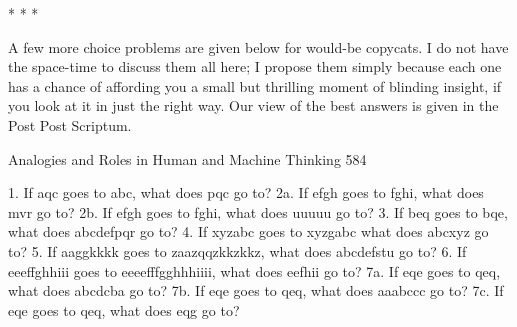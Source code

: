                                             *   *   *

        A few more choice problems are given below for would-be copycats. I do not
have the space-time to discuss them all here; I propose them simply because each one
has a chance of affording you a small but thrilling moment of blinding insight, if you
look at it in just the right way. Our view of the best answers is given in the Post Post
Scriptum.




Analogies and Roles in Human and Machine Thinking                                     584

       1. If aqc goes to abc, what does pqc go to?
       2a. If efgh goes to fghi, what does mvr go to?
       2b. If efgh goes to fghi, what does uuuuu go to?
       3. If beq goes to bqe, what does abcdefpqr go to?
       4. If xyzabc goes to xyzgabc what does abcxyz go to?
       5. If aaggkkkk goes to zaazqqzkkzkkz, what does abcdefstu go to?
       6. If eeeffghhiii goes to eeeefffgghhhiiii, what does eefhii go to?
       7a. If eqe goes to qeq, what does abcdcba go to?
       7b. If eqe goes to qeq, what does aaabccc go to?
       7c. If eqe goes to qeq, what does eqg go to?

